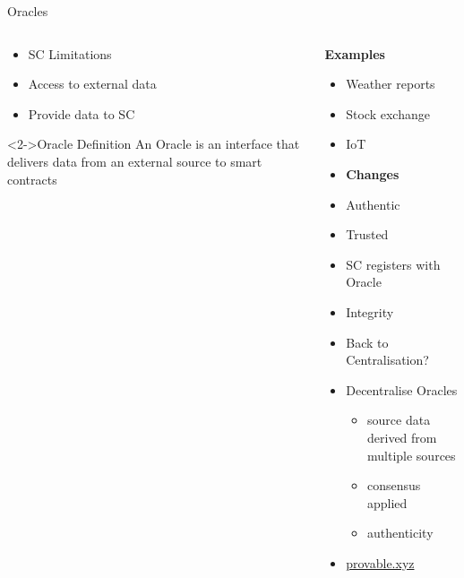 \documentclass[pdf,table]{beamer}
\begin{document}
\begin{frame}{Oracles} %
	\begin{columns}[T]
		\begin{column}{0.48\textwidth}
			\begin{itemize}
				\item SC Limitations
				\item Access to external data
				\item Provide data to SC
				
			\end{itemize}
			\begin{block}<2->{Oracle Definition }
				An Oracle is an interface that delivers data from an external source to smart contracts \cite{bashir2018}
			\end{block}
		\end{column}
		\begin{column}{0.48\textwidth}
			{\bf Examples}
			\begin{itemize}
				\item<3-> Weather reports
				\item<3-> Stock exchange
				\item<3-> IoT
				\item<4-> {\bf Changes}
				\item<4-> Authentic
				\item<4-> Trusted
				\item<4-> SC registers with Oracle
				\item<4-> Integrity
				\item<4-> Back to Centralisation?
				\item<5-> Decentralise Oracles
					\begin{itemize}
						\item source data derived from multiple sources
						\item consensus applied 
						\item authenticity
					\end{itemize}
				\item<6-> \url{provable.xyz}
			\end{itemize}
		\end{column}
	\end{columns}	
\end{frame}
\end{document}
